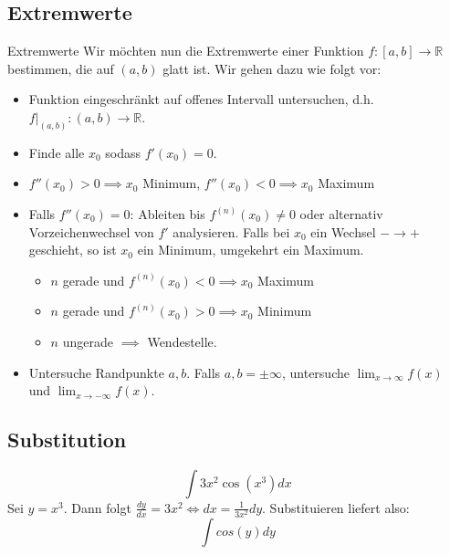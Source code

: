 \documentclass[a4paper,10pt]{article}
\begin{document}
\subsection{Extremwerte}
\begin{subbox}{Extremwerte}
  Wir möchten nun die Extremwerte einer Funktion $f: [a, b] \to \mathbb{R}$ bestimmen, die auf $(a, b)$ glatt ist. Wir gehen dazu wie folgt vor:
  \begin{itemize}
    \item Funktion eingeschränkt auf offenes Intervall untersuchen, d.h. $f|_{(a,b)}: (a, b) \to \mathbb{R}$.
    \item Finde alle $x_0$ sodass $f'(x_0) = 0$.
    \item $f''(x_0) > 0 \implies x_0$ Minimum, $f''(x_0) < 0 \implies x_0$ Maximum
    \item Falls $f''(x_0) = 0$: Ableiten bis $f^{(n)}(x_0) \neq 0$ oder alternativ Vorzeichenwechsel von $f'$ analysieren. Falls bei $x_0$ ein Wechsel $- \to +$ geschieht, so ist $x_0$ ein Minimum, umgekehrt ein Maximum. {
      \begin{itemize}
        \item $n$ gerade und $f^{(n)}(x_0) < 0 \implies x_0$ Maximum
        \item $n$ gerade und $f^{(n)}(x_0) > 0 \implies x_0$ Minimum
        \item $n$ ungerade $\implies$ Wendestelle.
      \end{itemize} 
    }
    \item Untersuche Randpunkte $a, b$. Falls $a, b = \pm \infty$, untersuche $\lim_{x \to \infty} f(x)$ und $\lim_{x \to -\infty} f(x)$.
  \end{itemize}
\end{subbox}

\subsection{Substitution}
$$\int 3x^2 \cos(x^3) dx$$
Sei $y = x^3$. Dann folgt $\frac{dy}{dx} = 3x^2 \iff dx = \frac{1}{3x^2} dy$. Substituieren liefert also:
$$\int cos(y) dy$$
\end{document}
